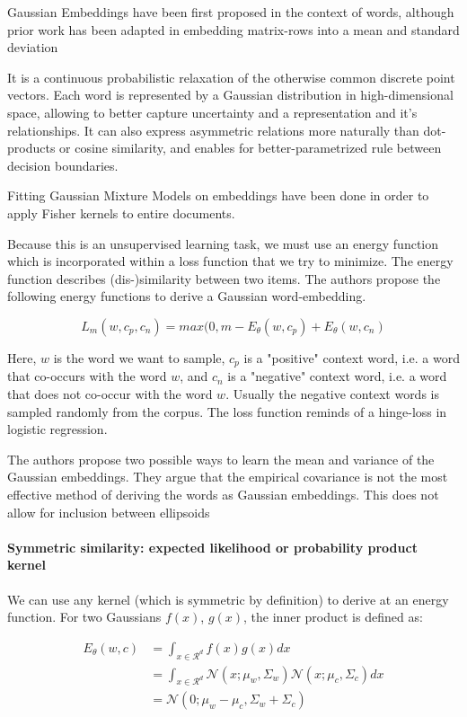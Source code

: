 \documentclass[a4paper,12pt,twoside,openright]{report}
\begin{document}
Gaussian Embeddings have been first proposed in the context of words, although prior work has been adapted in embedding matrix-rows into a mean and standard deviation \cite{vilnis14} 

It is a continuous probabilistic relaxation of the otherwise common discrete point vectors.
Each word is represented by a Gaussian distribution in high-dimensional space, allowing to better capture uncertainty and a representation and it's relationships.
It can also express asymmetric relations more naturally than dot-products or cosine similarity, and enables for better-parametrized rule between decision boundaries.

Fitting Gaussian Mixture Models on embeddings have been done in order to apply Fisher kernels to entire documents.

Because this is an unsupervised learning task, we must use an energy function which is incorporated within a loss function that we try to minimize. 
The energy function describes (dis-)similarity between two items.
The authors propose the following energy functions to derive a Gaussian word-embedding.

\begin{equation}
L_m(w, c_p, c_n) = max(0, m - E_\theta(w, c_p) + E_\theta(w, c_n)
\end{equation}

Here, $w$ is the word we want to sample, $c_p$ is a "positive" context word, i.e. a word that co-occurs with the word $w$, and $c_n$ is a "negative" context word, i.e. a word that does not co-occur with the word $w$.
Usually the negative context words is sampled randomly from the corpus.
The loss function reminds of a hinge-loss in logistic regression.

The authors propose two possible ways to learn the mean and variance of the Gaussian embeddings.
They argue that the empirical covariance is not the most effective method of deriving the words as Gaussian embeddings.
This does not allow for inclusion between ellipsoids 

\paragraph{Symmetric similarity: expected likelihood or probability product kernel}

We can use any kernel (which is symmetric by definition) to derive at an energy function.
For two Gaussians $f(x)$, $g(x)$, the inner product is defined as:

\begin{align}
E_\theta(w, c) &= \int_{x \in \mathcal{R}^d} f(x)g(x) dx \\
&= \int_{x \in \mathcal{R}^d} \mathcal{N}(x; \mu_w, \Sigma_w) \mathcal{N}(x; \mu_c, \Sigma_c) dx \\
&= \mathcal{N}(0; \mu_w - \mu_c, \Sigma_w + \Sigma_c)
\end{align}
\end{document}
